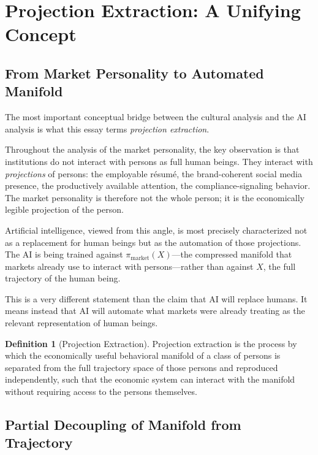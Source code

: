 \documentclass[12pt, a4paper]{article}
\theoremstyle{plain}
\theoremstyle{definition}
\newtheorem{definition}{Definition}
\theoremstyle{remark}
\begin{document}
\section{Projection Extraction: A Unifying Concept}

\subsection{From Market Personality to Automated Manifold}

The most important conceptual bridge between the cultural analysis and the AI
analysis is what this essay terms \emph{projection extraction}.

Throughout the analysis of the market personality, the key observation is that
institutions do not interact with persons as full human beings.
They interact with \emph{projections} of persons: the employable résumé, the
brand-coherent social media presence, the productively available attention,
the compliance-signaling behavior.
The market personality is therefore not the whole person; it is the economically
legible projection of the person.

Artificial intelligence, viewed from this angle, is most precisely characterized
not as a replacement for human beings but as the automation of those projections.
The AI is being trained against $\pi_{\mathrm{market}}(X)$---the compressed manifold
that markets already use to interact with persons---rather than against $X$, the
full trajectory of the human being.

This is a very different statement than the claim that AI will replace humans.
It means instead that AI will automate what markets were already treating as the
relevant representation of human beings.

\begin{definition}[Projection Extraction]
Projection extraction is the process by which the economically useful behavioral
manifold of a class of persons is separated from the full trajectory space of
those persons and reproduced independently, such that the economic system can
interact with the manifold without requiring access to the persons themselves.
\end{definition}

\subsection{Partial Decoupling of Manifold from Trajectory}
\end{document}
